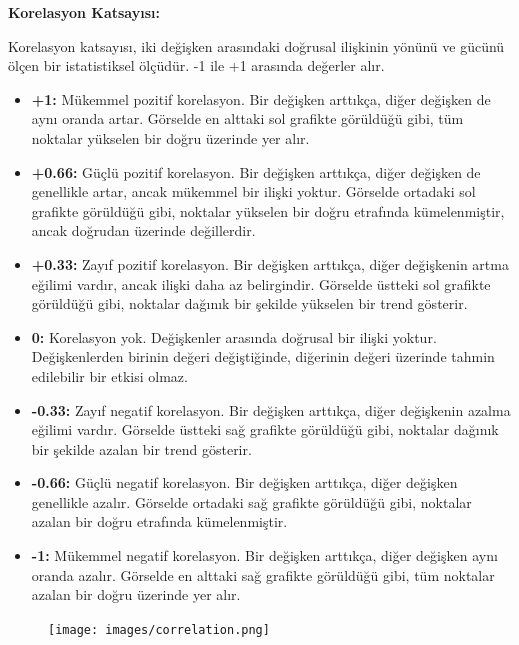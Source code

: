 \documentclass[
  letterpaper,
  DIV=11,
  numbers=noendperiod]{scrartcl}
\begin{document}
\begin{tcolorbox}[enhanced jigsaw, bottomrule=.15mm, opacitybacktitle=0.6, rightrule=.15mm, left=2mm, toprule=.15mm, leftrule=.75mm, titlerule=0mm, colframe=quarto-callout-note-color-frame, opacityback=0, arc=.35mm, colbacktitle=quarto-callout-note-color!10!white, title=\textcolor{quarto-callout-note-color}{\faInfo}\hspace{0.5em}{Not}, coltitle=black, breakable, bottomtitle=1mm, toptitle=1mm, colback=white]

\textbf{Korelasyon Katsayısı:}

Korelasyon katsayısı, iki değişken arasındaki doğrusal ilişkinin yönünü
ve gücünü ölçen bir istatistiksel ölçüdür. -1 ile +1 arasında değerler
alır.

\begin{itemize}
\item
  \textbf{+1:} Mükemmel pozitif korelasyon. Bir değişken arttıkça, diğer
  değişken de aynı oranda artar. Görselde en alttaki sol grafikte
  görüldüğü gibi, tüm noktalar yükselen bir doğru üzerinde yer alır.
\item
  \textbf{+0.66:} Güçlü pozitif korelasyon. Bir değişken arttıkça, diğer
  değişken de genellikle artar, ancak mükemmel bir ilişki yoktur.
  Görselde ortadaki sol grafikte görüldüğü gibi, noktalar yükselen bir
  doğru etrafında kümelenmiştir, ancak doğrudan üzerinde değillerdir.
\item
  \textbf{+0.33:} Zayıf pozitif korelasyon. Bir değişken arttıkça, diğer
  değişkenin artma eğilimi vardır, ancak ilişki daha az belirgindir.
  Görselde üstteki sol grafikte görüldüğü gibi, noktalar dağınık bir
  şekilde yükselen bir trend gösterir.
\item
  \textbf{0:} Korelasyon yok. Değişkenler arasında doğrusal bir ilişki
  yoktur. Değişkenlerden birinin değeri değiştiğinde, diğerinin değeri
  üzerinde tahmin edilebilir bir etkisi olmaz.
\item
  \textbf{-0.33:} Zayıf negatif korelasyon. Bir değişken arttıkça, diğer
  değişkenin azalma eğilimi vardır. Görselde üstteki sağ grafikte
  görüldüğü gibi, noktalar dağınık bir şekilde azalan bir trend
  gösterir.
\item
  \textbf{-0.66:} Güçlü negatif korelasyon. Bir değişken arttıkça, diğer
  değişken genellikle azalır. Görselde ortadaki sağ grafikte görüldüğü
  gibi, noktalar azalan bir doğru etrafında kümelenmiştir.
\item
  \textbf{-1:} Mükemmel negatif korelasyon. Bir değişken arttıkça, diğer
  değişken aynı oranda azalır. Görselde en alttaki sağ grafikte
  görüldüğü gibi, tüm noktalar azalan bir doğru üzerinde yer alır.
\end{itemize}

\begin{figure}[H]

{\centering \texttt{[image: images/correlation.png]}

}

\end{figure}

\end{tcolorbox}
\end{document}
